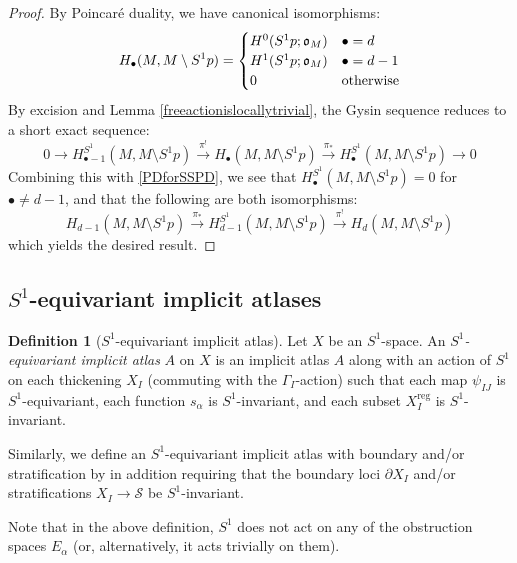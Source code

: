 \documentclass[12pt]{article}
\theoremstyle{definition}
\newtheorem{definition}[theorem]{Definition}
\theoremstyle{remark}
\numberwithin{equation}{subsection}
\newcommand{\oo}{\mathfrak o}
\newcommand{\SSS}{\mathcal S}
\newcommand{\reg}{\mathrm{reg}}
\begin{document}
\begin{proof}
By Poincar\'e duality, we have canonical isomorphisms:
\begin{equation}\label{PDforSSPD}
H_\bullet(M,M\setminus S^1p)=\begin{cases}H^0(S^1p;\oo_M)&\bullet=d\cr H^1(S^1p;\oo_M)&\bullet=d-1\cr 0&\text{otherwise}\end{cases}
\end{equation}
By excision and Lemma \ref{freeactionislocallytrivial}, the Gysin sequence reduces to a short exact sequence:
\begin{equation}\label{reducedgysinserreforSSPD}
0\to H_{\bullet-1}^{S^1}(M,M\setminus S^1p)\xrightarrow{\pi^!}H_\bullet(M,M\setminus S^1p)\xrightarrow{\pi_\ast}H_\bullet^{S^1}(M,M\setminus S^1p)\to 0
\end{equation}
Combining this with \eqref{PDforSSPD}, we see that $H_\bullet^{S^1}(M,M\setminus S^1p)=0$ for $\bullet\ne d-1$, and that the following are both isomorphisms:
\begin{equation}\label{gysinweirdcomposition}
H_{d-1}(M,M\setminus S^1p)\xrightarrow{\pi_\ast}H_{d-1}^{S^1}(M,M\setminus S^1p)\xrightarrow{\pi^!}H_d(M,M\setminus S^1p)
\end{equation}
which yields the desired result.
\end{proof}

\subsection{\texorpdfstring{$S^1$}{S{\textasciicircum}1}-equivariant implicit atlases}

\begin{definition}[$S^1$-equivariant implicit atlas]\label{SSimplicitatlasdef}
Let $X$ be an $S^1$-space.  An \emph{$S^1$-equivariant implicit atlas} $A$ on $X$ is an implicit atlas $A$ along with an action of $S^1$ on each thickening $X_I$ (commuting with the $\Gamma_I$-action) such that each map $\psi_{IJ}$ is $S^1$-equivariant, each function $s_\alpha$ is $S^1$-invariant, and each subset $X_I^\reg$ is $S^1$-invariant.

Similarly, we define an $S^1$-equivariant implicit atlas with boundary and/or stratification by in addition requiring that the boundary loci $\partial X_I$ and/or stratifications $X_I\to\SSS$ be $S^1$-invariant.
\end{definition}

Note that in the above definition, $S^1$ does not act on any of the obstruction spaces $E_\alpha$ (or, alternatively, it acts trivially on them).
\end{document}
